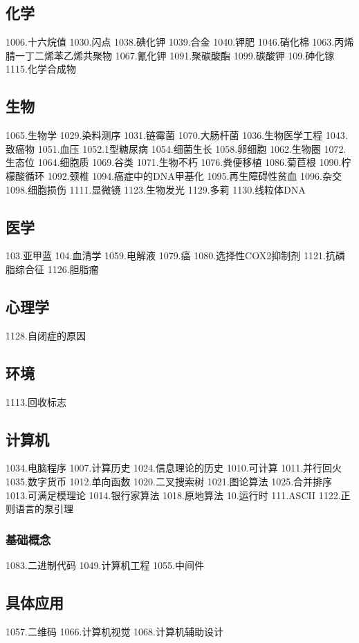 \subsection{化学}
1006.十六烷值
1030.闪点
1038.碘化钾
1039.合金
1040.钾肥
1046.硝化棉
1063.丙烯腈一丁二烯苯乙烯共聚物
1067.氰化钾
1091.聚碳酸酯
1099.碳酸钾
109.砷化镓
1115.化学合成物

\subsection{生物}
1065.生物学
1029.染料测序
1031.链霉菌
1070.大肠杆菌
1036.生物医学工程
1043.致癌物
1051.血压
1052.1型糖尿病
1054.细菌生长
1058.卵细胞
1062.生物圈
1072.生态位
1064.细胞质
1069.谷类
1071.生物不朽
1076.粪便移植
1086.菊苣根
1090.柠檬酸循环
1092.颈椎
1094.癌症中的DNA甲基化
1095.再生障碍性贫血
1096.杂交
1098.细胞损伤
1111.显微镜
1123.生物发光
1129.多莉
1130.线粒体DNA

\subsection{医学}
103.亚甲蓝
104.血清学
1059.电解液
1079.癌
1080.选择性COX2抑制剂
1121.抗磷脂综合征
1126.胆脂瘤

\subsection{心理学}
1128.自闭症的原因

\subsection{环境}
1113.回收标志

\subsection{计算机}
1034.电脑程序
1007.计算历史
1024.信息理论的历史
1010.可计算
1011.并行回火
1035.数字货币
1012.单向函数
1020.二叉搜索树
1021.图论算法
1025.合并排序
1013.可满足模理论
1014.银行家算法
1018.原地算法
10.运行时
111.ASCII
1122.正则语言的泵引理

\subsubsection{基础概念}
1083.二进制代码
1049.计算机工程
1055.中间件

\subsection{具体应用}
1057.二维码
1066.计算机视觉
1068.计算机辅助设计

